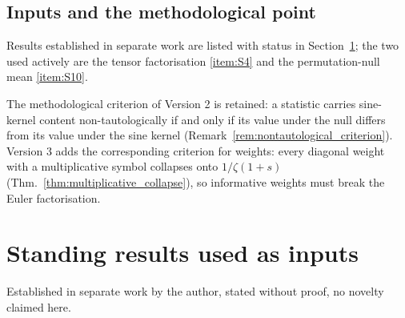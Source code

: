 \documentclass[11pt]{amsart}
\numberwithin{equation}{section}
\theoremstyle{plain}
\theoremstyle{definition}
\theoremstyle{remark}
\begin{document}
\subsection{Inputs and the methodological point}
\label{subsec:inputs}

Results established in separate work are listed with status in
Section~\ref{sec:standing_results}; the two used actively are the tensor
factorisation \ref{item:S4} and the permutation-null mean \ref{item:S10}.

The methodological criterion of Version 2 is retained: a statistic
carries sine-kernel content non-tautologically if and only if its value
under the null differs from its value under the sine kernel
(Remark~\ref{rem:nontautological_criterion}). Version 3 adds the
corresponding criterion for weights: every diagonal weight with a
multiplicative symbol collapses onto $1/\zeta(1+s)$
(Thm.~\ref{thm:multiplicative_collapse}), so informative weights must
break the Euler factorisation.

\section{Standing results used as inputs}
\label{sec:standing_results}

Established in separate work by the author, stated without proof, no
novelty claimed here.
\end{document}
